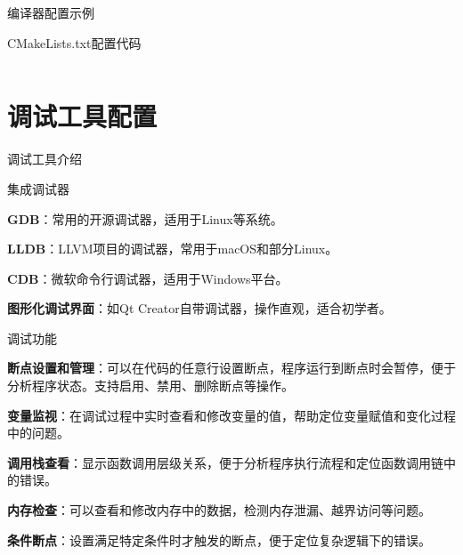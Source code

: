 \documentclass[UTF8,aspectratio=169]{beamer}
\begin{document}
\begin{frame}[fragile]{编译器配置示例}
    \begin{ytublock}{CMakeLists.txt配置代码}
        \inputminted[fontsize=\tiny,breaklines=true,breakanywhere=true,linenos=true,frame=lines,framesep=3mm,rulecolor=\color{blue!20},bgcolor=blue!10]{cmake}{code/CMakeLists.txt}
    \end{ytublock}
\end{frame}

\section{调试工具配置}

\begin{frame}{调试工具介绍}
    \begin{ytublock}{集成调试器}
        \begin{itemize}
            {\small
            \item \textbf{GDB}：常用的开源调试器，适用于Linux等系统。
            \item \textbf{LLDB}：LLVM项目的调试器，常用于macOS和部分Linux。
            \item \textbf{CDB}：微软命令行调试器，适用于Windows平台。
            \item \textbf{图形化调试界面}：如Qt Creator自带调试器，操作直观，适合初学者。
            }
        \end{itemize}
    \end{ytublock}

    \begin{ytublock}{调试功能}
        \begin{itemize}
            {\small
            \item \textbf{断点设置和管理}：可以在代码的任意行设置断点，程序运行到断点时会暂停，便于分析程序状态。支持启用、禁用、删除断点等操作。
            \item \textbf{变量监视}：在调试过程中实时查看和修改变量的值，帮助定位变量赋值和变化过程中的问题。
            \item \textbf{调用栈查看}：显示函数调用层级关系，便于分析程序执行流程和定位函数调用链中的错误。
            \item \textbf{内存检查}：可以查看和修改内存中的数据，检测内存泄漏、越界访问等问题。
            \item \textbf{条件断点}：设置满足特定条件时才触发的断点，便于定位复杂逻辑下的错误。
            }
        \end{itemize}
    \end{ytublock}
\end{frame}
\end{document}
